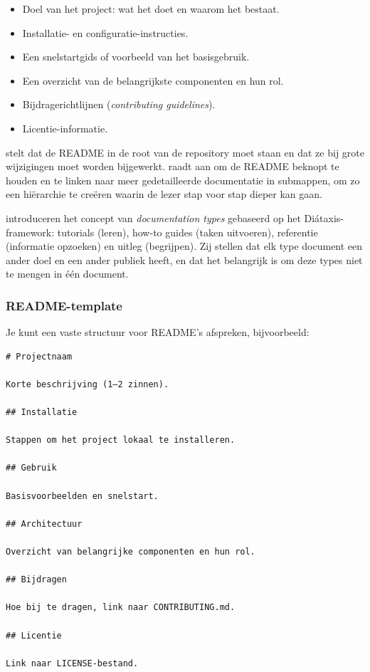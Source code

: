 \begin{itemize}
    \item Doel van het project: wat het doet en waarom het bestaat.
    \item Installatie- en configuratie-instructies.
    \item Een snelstartgids of voorbeeld van het basisgebruik.
    \item Een overzicht van de belangrijkste componenten en hun rol.
    \item Bijdragerichtlijnen (\textit{contributing guidelines}).
    \item Licentie-informatie.
\end{itemize}

\textcite{gentle2017docslikecode} stelt dat de README in de root van de repository moet staan en dat ze bij grote wijzigingen moet worden bijgewerkt. \textcite{etter2016moderntechwriting} raadt aan om de README beknopt te houden en te linken naar meer gedetailleerde documentatie in submappen, om zo een hiërarchie te creëren waarin de lezer stap voor stap dieper kan gaan.

\textcite{bhatti2021docsdevelopers} introduceren het concept van \textit{documentation types} gebaseerd op het Diátaxis-framework: tutorials (leren), how-to guides (taken uitvoeren), referentie (informatie opzoeken) en uitleg (begrijpen). Zij stellen dat elk type document een ander doel en een ander publiek heeft, en dat het belangrijk is om deze types niet te mengen in één document.

\subsubsection{README-template}
Je kunt een vaste structuur voor README's afspreken, bijvoorbeeld:

\begin{verbatim}
# Projectnaam

Korte beschrijving (1–2 zinnen).

## Installatie

Stappen om het project lokaal te installeren.

## Gebruik

Basisvoorbeelden en snelstart.

## Architectuur

Overzicht van belangrijke componenten en hun rol.

## Bijdragen

Hoe bij te dragen, link naar CONTRIBUTING.md.

## Licentie

Link naar LICENSE-bestand.
\end{verbatim}

